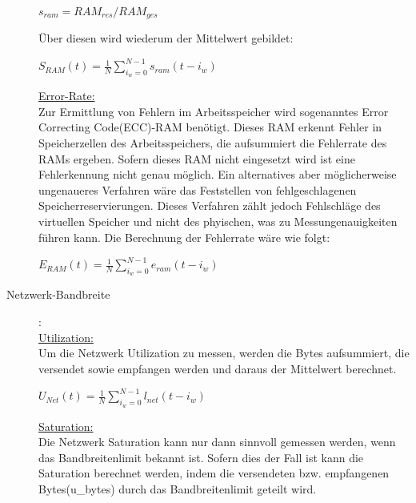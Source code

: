 \documentclass[a4paper,10pt]{scrartcl}
\begin{document}
\begin{description}
\begin{minipage}{\linewidth}
\(
\displaystyle{s_{ram}=RAM_{res}/RAM_{ges}}
\) 
\end{minipage}

Über diesen wird wiederum der Mittelwert gebildet:\\

\begin{minipage}{\linewidth}
\(
\displaystyle{S_{RAM}(t)=\frac{1}{N}{\sum\limits_{i_{w}=0}^{N-1} s_{ram}{(t-i_{w})}} }
\) 
\end{minipage}

\underline{Error-Rate:}\\
Zur Ermittlung von Fehlern im Arbeitsspeicher wird sogenanntes \glqq Error Correcting Code\grqq(ECC)-RAM benötigt. Dieses RAM erkennt Fehler in Speicherzellen des Arbeitsspeichers, die aufsummiert die Fehlerrate des RAMs ergeben. Sofern dieses RAM nicht eingesetzt wird ist eine Fehlerkennung nicht genau möglich. Ein alternatives aber möglicherweise ungenaueres Verfahren wäre das Feststellen von fehlgeschlagenen Speicherreservierungen. Dieses Verfahren zählt jedoch Fehlschläge des virtuellen Speicher und nicht des phyischen, was zu Messungenauigkeiten führen kann.
Die Berechnung der Fehlerrate wäre wie folgt:\\

\begin{minipage}{\linewidth}
\(
\displaystyle{E_{RAM}(t)=\frac{1}{N}{\sum\limits_{i_{w}=0}^{N-1} e_{ram}{(t-i_{w})}} }
\) 
\end{minipage}

\pagebreak

\item[Netzwerk-Bandbreite]:\\
\underline{Utilization:}\\
Um die Netzwerk Utilization zu messen, werden die Bytes aufsummiert, die versendet sowie empfangen werden und daraus der Mittelwert berechnet.\\

\begin{minipage}{\linewidth}
\(
\displaystyle{U_{Net}(t)=\frac{1}{N}{\sum\limits_{i_{w}=0}^{N-1} l_{net}{(t-i_{w})}} }
\) 
\end{minipage}

\underline{Saturation:}\\
Die Netzwerk Saturation kann nur dann sinnvoll gemessen werden, wenn das Bandbreitenlimit bekannt ist. Sofern dies der Fall ist kann die Saturation berechnet werden, indem die versendeten bzw. empfangenen Bytes(u\_bytes) durch das Bandbreitenlimit geteilt wird. \\


\end{description}
\end{document}
